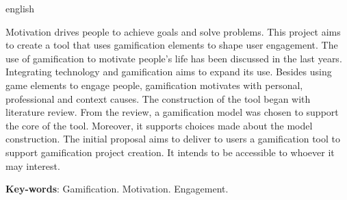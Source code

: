 \begin{resumo}[Abstract]
 \begin{otherlanguage*}{english}

Motivation drives people to achieve goals and solve problems. This project aims to create a tool that uses gamification elements to shape user engagement. The use of gamification to motivate people’s life has been discussed in the last years. Integrating technology and gamification aims to expand its use. Besides using game elements to engage people, gamification motivates with personal, professional and context causes. The construction of the tool began with literature review. From the review, a gamification model was chosen to support the core of the tool. Moreover, it supports choices made about the model construction. The initial proposal aims to deliver to users a gamification tool to support gamification project creation. It intends to be accessible to  whoever it may interest.
   \vspace{\onelineskip}
 
   \noindent 
   \textbf{Key-words}: Gamification. Motivation. Engagement.
 \end{otherlanguage*}
\end{resumo}
